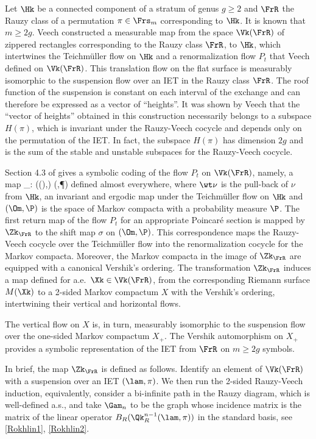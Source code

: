 Let $\Hk$ be a connected component of a stratum of genus $g\ge 2$ and $\FrR$ the Rauzy class of a permutation $\pi\in \Frs_m$ corresponding to $\Hk$. It is known that $m\ge 2g$.
Veech \cite{veech}
constructed a measurable map from the space $\Vk(\FrR)$ of
zippered rectangles corresponding to the Rauzy class $\FrR$, to $\Hk$, which intertwines the Teichmüller flow on $\Hk$ and a renormalization flow $P_t$ that Veech defined on $\Vk(\FrR)$. This translation flow on the flat surface is measurably isomorphic to the suspension flow over an IET in the Rauzy class $\FrR$. The roof function of the suspension is constant on each interval of the exchange and can therefore be expressed as a vector of ``heights''.
It was shown by Veech \cite{veechamj} that the ``vector of heights'' obtained in this construction necessarily belongs to a subspace $H(\pi)$, which is invariant under the Rauzy-Veech cocycle and depends only on the permutation of the IET. In fact, the subspace $H(\pi)$ has dimension $2g$ and is the sum of the stable and unstable subspaces for the Rauzy-Veech cocycle.

Section 4.3 of \cite{Buf-umn} gives a symbolic coding of the flow $P_t$ on $\Vk(\FrR)$, namely, a map
\be \label{map-veech}
\Zk_{\FrR}: (\Vk(\FrR),\wt\nu) \to (\Om,\P)
\ee
defined almost everywhere, where $\wt\nu$ is the pull-back of $\nu$ from $\Hk$, an invariant and ergodic map under the Teichmüller flow on
$\Hk$ and $(\Om,\P)$ is the space of Markov compacta with a probability measure $\P$.
The first return map of the flow $P_t$ for an appropriate Poincaré section is mapped by $\Zk_\FrR$ to the shift map $\sigma$ on $(\Om,\P)$. This correspondence maps the Rauzy-Veech cocycle over the Teichmüller flow into the renormalization cocycle for the Markov compacta. Moreover, the Markov compacta in the image of $\Zk_{\FrR}$ are equipped with a
canonical Vershik's ordering.
The transformation $\Zk_\FrR$ induces a map defined for a.e.\ $\Xk\in \Vk(\FrR)$, from the corresponding Riemann surface $M(\Xk)$ to a 2-sided Markov compactum $X$ with the Vershik's ordering, intertwining their vertical and horizontal flows.

The vertical flow on $X$ is, in turn, measurably isomorphic to the suspension flow over the one-sided Markov compactum $X_+$. The Vershik automorphism on $X_+$ provides a symbolic representation of the IET from $\FrR$ on $m\ge 2g$ symbols.

In brief, the map $\Zk_\FrR$ is defined as follows. Identify an element of $\Vk(\FrR)$ with a suspension over an IET $(\lam,\pi)$.
We then run the 2-sided Rauzy-Veech induction, equivalently, consider a bi-infinite path in the Rauzy diagram, which is well-defined a.s., and take
$\Gam_n$ to be the graph whose incidence matrix is the matrix of the linear operator $B_R(\Qk^{n-1}_R(\lam,\pi))$ in the standard basis, see \eqref{Rokhlin1}, \eqref{Rokhlin2}.


